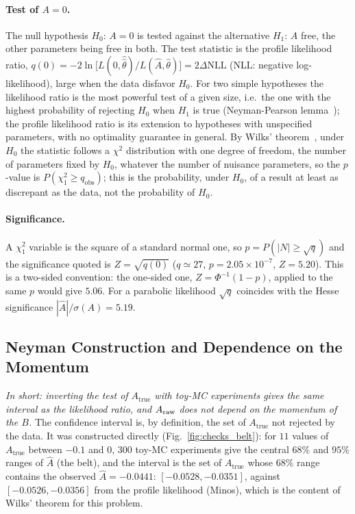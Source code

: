\paragraph{Test of $A=0$.}
The null hypothesis $H_0$: $A=0$ is tested against the alternative $H_1$: $A$ free, the other parameters being free in both. The test statistic is the profile likelihood ratio,
$q(0)=-2\ln\big[L(0,\hat{\hat\theta})/L(\hat A,\hat\theta)\big]=2\Delta\mathrm{NLL}$ (NLL: negative log-likelihood), large when the data disfavor $H_0$. For two simple hypotheses the likelihood ratio is the most powerful test of a given size, i.e.\ the one with the highest probability of rejecting $H_0$ when $H_1$ is true (Neyman-Pearson lemma~\cite{neyman_pearson}); the profile likelihood ratio is its extension to hypotheses with unspecified parameters, with no optimality guarantee in general. By Wilks' theorem~\cite{wilks}, under $H_0$ the statistic follows a $\chi^2$ distribution with one degree of freedom, the number of parameters fixed by $H_0$, whatever the number of nuisance parameters, so the $p$-value is $P(\chi^2_1\geq q_{\mathrm{obs}})$; this is the probability, under $H_0$, of a result at least as discrepant as the data, not the probability of $H_0$.

\paragraph{Significance.}
A $\chi^2_1$ variable is the square of a standard normal one, so $p=P(|N|\geq\sqrt{q})$ and the significance quoted is $Z=\sqrt{q(0)}$ ($q\simeq27$, $p=2.05\times10^{-7}$, $Z=5.20$). This is a two-sided convention: the one-sided one, $Z=\Phi^{-1}(1-p)$, applied to the same $p$ would give $5.06$. For a parabolic likelihood $\sqrt{q}$ coincides with the Hesse significance $|\hat A|/\sigma(A)=5.19$.



\subsection{Neyman Construction and Dependence on the Momentum}
\label{sec:checks_belt}
\emph{In short: inverting the test of $A_{\mathrm{true}}$ with toy-MC experiments gives the same interval as the likelihood ratio, and $A_{\mathrm{raw}}$ does not depend on the momentum of the $B$.}
The confidence interval is, by definition, the set of $A_{\mathrm{true}}$ not rejected by the data. It was constructed directly (Fig.~\ref{fig:checks_belt}): for $11$ values of $A_{\mathrm{true}}$ between $-0.1$ and $0$, $300$ toy-MC experiments give the central $68\%$ and $95\%$ ranges of $\hat A$ (the belt), and the interval is the set of $A_{\mathrm{true}}$ whose $68\%$ range contains the observed $\hat A=-0.0441$: $[-0.0528,-0.0351]$, against $[-0.0526,-0.0356]$ from the profile likelihood (Minos), which is the content of Wilks' theorem for this problem.

